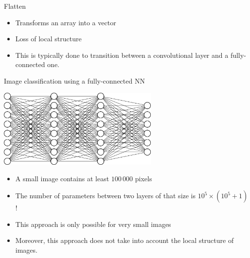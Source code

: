 \documentclass[xcolor=pdftex,dvipsnames,table,mathserif]{beamer}
\begin{document}
\begin{frame}{Flatten}

  \begin{itemize}
  \item Transforms an array into a vector
  \item Loss of local structure
  \item This is typically done to transition between a convolutional layer and a fully-connected one.
  \end{itemize}

\end{frame}



\begin{frame}{Image classification using a fully-connected NN}

  \centering
  \includegraphics[width=0.6\textwidth]{mini_reseau3_bis}

  \begin{itemize}[<+->]
  \item A small image contains at least $100\,000$ pixels
  \item The number of parameters between two layers of that size is $10^5 \times (10^5 + 1)$!
  \item This approach is only possible for very small images
  \item Moreover, this approach does not take into account the local structure of images.
  \end{itemize}

\end{frame}
\end{document}
